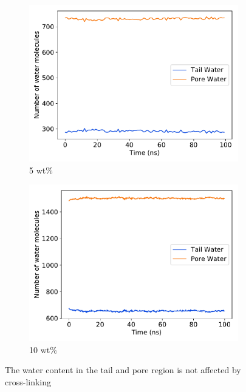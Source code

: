 \documentclass{article}
\begin{document}
  \begin{figure}[!htb]
  \centering
  \begin{subfigure}{0.45\textwidth}
  \includegraphics[width=\textwidth]{5wt_offset_xlinked_equil.pdf}
  \caption{5 wt\%}\label{fig:5wt_offset_xlinked_equil}
  \end{subfigure}
  \begin{subfigure}{0.45\textwidth}
  \includegraphics[width=\textwidth]{10wt_offset_xlinked_equil.pdf}
  \caption{10 wt\%}\label{fig:10wt_offset_xlinked_equil}
  \end{subfigure}
  \caption{The water content in the tail and pore region is not affected
  by cross-linking}\label{fig:solvation_equilibration}
  \end{figure}
  
\end{document}
